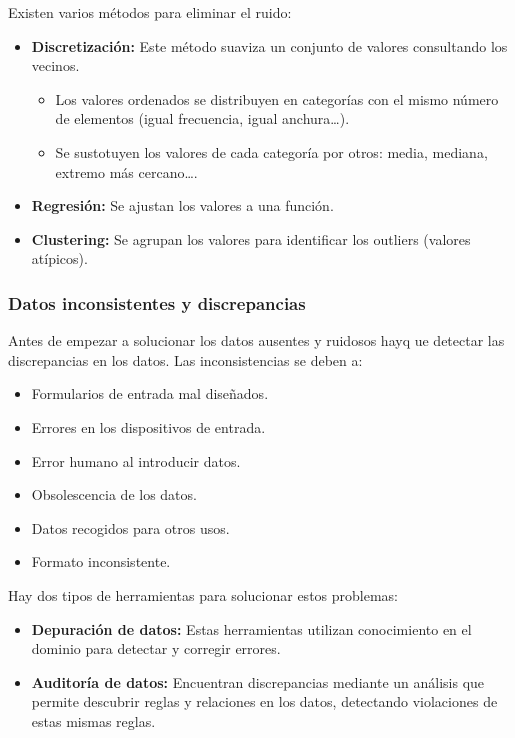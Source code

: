 \documentclass[12pt, letterpaper]{article}
\begin{document}
Existen varios métodos para eliminar el ruido:
\begin{itemize}
    \item \textbf{Discretización:} Este método suaviza un conjunto de valores consultando los vecinos. 
    \begin{itemize}
        \item Los valores ordenados se distribuyen en categorías con el mismo número de elementos (igual frecuencia, igual anchura\dots).
        \item Se sustotuyen los valores de cada categoría por otros: media, mediana, extremo más cercano\dots. 
    \end{itemize}
    \item \textbf{Regresión:} Se ajustan los valores a una función.
    \item \textbf{Clustering:} Se agrupan los valores para identificar los outliers (valores atípicos).
\end{itemize}

\subsubsection{Datos inconsistentes y discrepancias}
Antes de empezar a solucionar los datos ausentes y ruidosos hayq ue detectar las discrepancias en los datos. Las inconsistencias se deben a:
\begin{itemize}
    \item Formularios de entrada mal diseñados.
    \item Errores en los dispositivos de entrada.
    \item Error humano al introducir datos.
    \item Obsolescencia de los datos.
    \item Datos recogidos para otros usos.
    \item Formato inconsistente.
\end{itemize}

Hay dos tipos de herramientas para solucionar estos problemas:
\begin{itemize}
    \item \textbf{Depuración de datos:} Estas herramientas utilizan conocimiento en el dominio para detectar y corregir errores.
    \item \textbf{Auditoría de datos:} Encuentran discrepancias mediante un análisis que permite descubrir reglas y relaciones en los datos, detectando violaciones de estas mismas reglas.
\end{itemize} 
\end{document}
